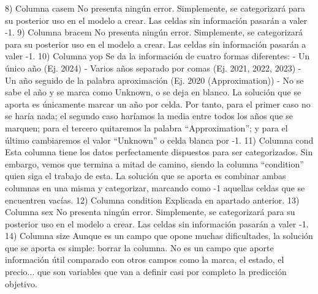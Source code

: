 8)	Columna casem
	No presenta ningún error. Simplemente, se categorizará para su posterior uso en el modelo a crear. Las celdas sin información pasarán a valer -1.
9)	Columna bracem
	No presenta ningún error. Simplemente, se categorizará para su posterior uso en el modelo a crear. Las celdas sin información pasarán a valer -1.
10)	Columna yop
	Se da la información de cuatro formas diferentes:
-	Un único año (Ej. 2024)
-	Varios años separado por comas (Ej. 2021, 2022, 2023)
-	Un año seguido de la palabra aproximación (Ej. 2020 (Approximation))
-	No se sabe el año y se marca como Unknown, o se deja en blanco.
	La solución que se aporta es únicamente marcar un año por celda. Por tanto, para el primer caso no se haría nada; el segundo caso haríamos la media entre todos los años que se marquen; para el tercero quitaremos la palabra “Approximation”; y para el último cambiaremos el valor “Unknown” o celda blanca por -1.
11)	Columna cond
	Esta columna tiene los datos perfectamente dispuestos para ser categorizados. Sin embargo, vemos que termina a mitad de camino, siendo la columna “condition” quien siga el trabajo de esta. La solución que se aporta es combinar ambas columnas en una misma y categorizar, marcando como -1 aquellas celdas que se encuentren vacías.
12)	Columna condition
	Explicada en apartado anterior.
13)	Columna sex
	No presenta ningún error. Simplemente, se categorizará para su posterior uso en el modelo a crear. Las celdas sin información pasarán a valer -1.
14)	Columna size
	Aunque es un campo que opone muchas dificultades, la solución que se aporta es simple: borrar la columna. No es un campo que aporte información útil comparado con otros campos como la marca, el estado, el precio... que son variables que van a definir casi por completo la predicción objetivo.
